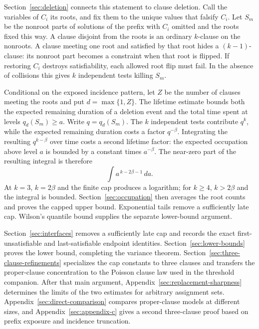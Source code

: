 Section~\ref{sec:deletion} connects this statement to clause deletion.
Call the variables of $C_i$ its roots, and fix them to the unique values
that falsify $C_i$. Let $S_m$ be the nonroot parts of solutions of the
prefix with $C_i$ omitted and the roots fixed this way. A clause disjoint
from the roots is an ordinary $k$-clause on the nonroots. A clause meeting
one root and satisfied by that root hides a $(k-1)$-clause: its nonroot
part becomes a constraint when that root is flipped. If restoring $C_i$
destroys satisfiability, each allowed root flip must fail. In the absence
of collisions this gives $k$ independent tests killing $S_m$.

Conditional on the exposed incidence pattern, let $Z$ be the number of
clauses meeting the roots and put $d=\max\{1,Z\}$. The lifetime estimate
bounds both the expected remaining duration of a deletion event and the
total time spent at levels $q_d(S_m)\ge a$. Write $q=q_d(S_m)$.
The $k$ independent tests contribute $q^k$, while the expected remaining
duration costs a factor $q^{-\beta}$. Integrating the resulting
$q^{k-\beta}$ over time costs a second lifetime factor: the expected
occupation above level $a$ is bounded by a constant times $a^{-\beta}$.
The near-zero part of the resulting integral is therefore
\[
 \int a^{\,k-2\beta-1}\,da.
\]
At $k=3$, $k=2\beta$ and the finite cap produces a logarithm; for
$k\ge4$, $k>2\beta$ and the integral is bounded. Section~\ref{sec:occupation}
then averages the root counts and proves the capped upper bound.
Exponential tails remove a sufficiently late cap. Wilson's quantile
bound supplies the separate lower-bound argument.

Section~\ref{sec:interfaces} removes a sufficiently late cap and records
the exact first-unsatisfiable and last-satisfiable endpoint identities.
Section~\ref{sec:lower-bounds} proves the lower bound, completing the
variance theorem. Section~\ref{sec:three-clause-refinements} specializes
the cap constants to three clauses and transfers the proper-clause
concentration to the Poisson clause law used in the threshold companion.
After that main argument,
Appendix~\ref{sec:replacement-sharpness} determines the limits of the
two estimates for arbitrary assignment sets.
Appendix~\ref{sec:direct-comparison} compares proper-clause models at
different sizes, and Appendix~\ref{sec:appendix-c} gives a second
three-clause proof based on prefix exposure and incidence truncation.
